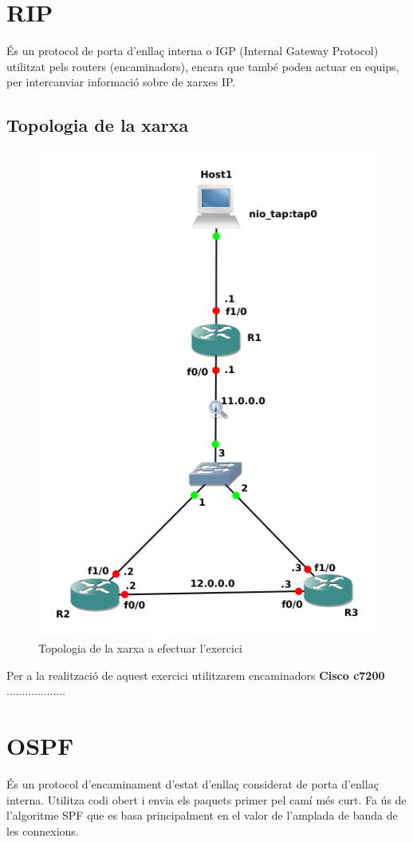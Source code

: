 \documentclass[10pt]{article}
\begin{document}
\section{RIP}
És un protocol de porta d'enllaç interna o IGP (Internal Gateway Protocol) utilitzat pels routers (encaminadors), encara que també poden actuar en equips, per intercanviar informació sobre de xarxes IP.
\subsection{Topologia de la xarxa}
\begin{figure}[H]
\begin{center}
\includegraphics[scale=0.5]{Images/rip.png}
\caption{Topologia de la xarxa a efectuar l'exercici}
\end{center}
\end{figure}
Per a la realització de aquest exercici utilitzarem encaminadors \textbf{Cisco c7200}
...................
\section{OSPF}
És un protocol d'encaminament d'estat d'enllaç considerat de porta d'enllaç interna. Utilitza codi obert i envia els paquets primer pel camí més curt. Fa ús de l'algoritme SPF que es basa principalment en el valor de l'amplada de banda de les connexions.
\end{document}
